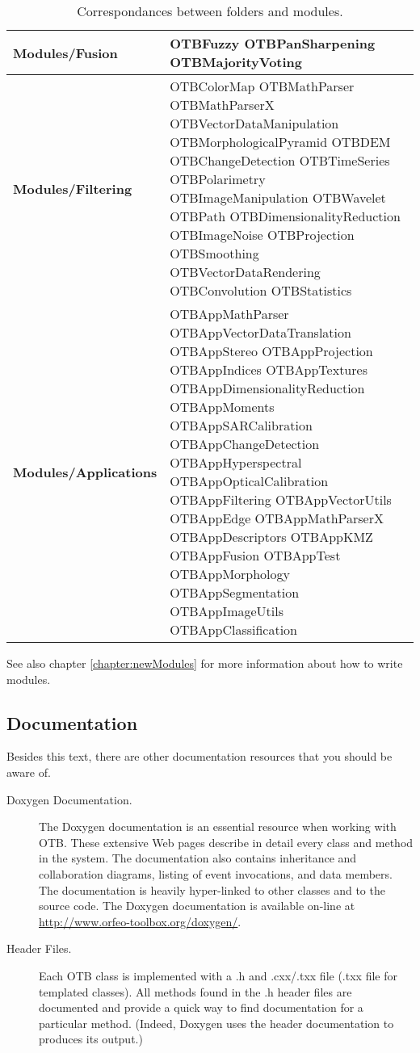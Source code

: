 \begin{center}
\begin{tiny}
\begin{table}[!htbp]
\begin{tabular}{|p{}|p{}|}
\hline
\textbf{Modules/Fusion } & OTBFuzzy OTBPanSharpening OTBMajorityVoting \\
\hline
\textbf{Modules/Filtering} & OTBColorMap OTBMathParser OTBMathParserX OTBVectorDataManipulation OTBMorphologicalPyramid OTBDEM OTBChangeDetection OTBTimeSeries OTBPolarimetry OTBImageManipulation OTBWavelet OTBPath OTBDimensionalityReduction OTBImageNoise OTBProjection OTBSmoothing OTBVectorDataRendering OTBConvolution OTBStatistics \\
\hline
\textbf{Modules/Applications} & OTBAppMathParser OTBAppVectorDataTranslation OTBAppStereo OTBAppProjection OTBAppIndices OTBAppTextures OTBAppDimensionalityReduction OTBAppMoments OTBAppSARCalibration OTBAppChangeDetection OTBAppHyperspectral OTBAppOpticalCalibration OTBAppFiltering OTBAppVectorUtils OTBAppEdge OTBAppMathParserX OTBAppDescriptors OTBAppKMZ OTBAppFusion OTBAppTest OTBAppMorphology OTBAppSegmentation OTBAppImageUtils OTBAppClassification \\
\hline
\end{tabular}
\caption{Correspondances between folders and modules.}
\label{tab:introduction1}
\end{table}
\end{tiny}
\end{center}

See also chapter \ref{chapter:newModules} for more information about how to write modules.

\subsection{Documentation}
\label{sec:Documentation}

Besides this text, there are other documentation resources that you should be
aware of.
\begin{description}
        \item[Doxygen Documentation.] The Doxygen documentation is an
        essential resource when working with OTB. These extensive Web
        pages describe in detail every class and method in the
        system. The documentation also contains inheritance and
        collaboration diagrams, listing of event invocations, and data
        members. The documentation is heavily hyper-linked to other
        classes and to the source code. The Doxygen documentation is
        available on-line at
        \url{http://www.orfeo-toolbox.org/doxygen/}.

	\item[Header Files.] Each OTB class is implemented with a .h and
        .cxx/.txx file (.txx file for templated classes). All methods
        found in the .h header files are documented and provide a quick way
        to find documentation for a particular method. (Indeed, Doxygen uses
        the header documentation to produces its output.)
\end{description}

